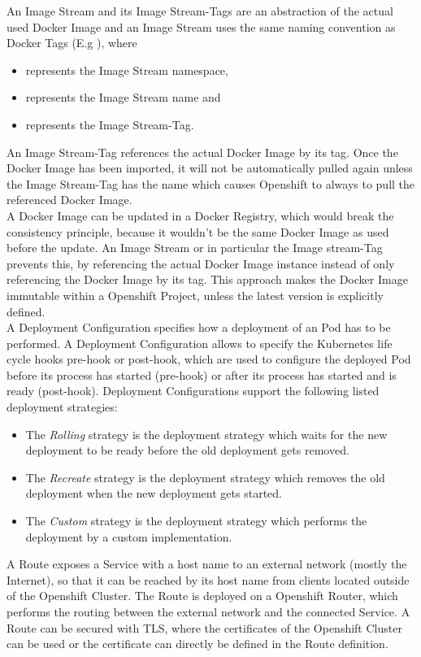 An Image Stream and its Image Stream-Tags are an abstraction of the actual used Docker Image and an Image Stream uses the same naming convention as Docker Tags (E.g ), where
\begin{itemize}
	\item {} represents the Image Stream namespace,
	\item {} represents the Image Stream name and
	\item {} represents the Image Stream-Tag.
\end{itemize}
An Image Stream-Tag references the actual Docker Image by its tag. Once the Docker Image has been imported, it will not be automatically pulled again unless the Image Stream-Tag has the name  which causes Openshift to always to pull the referenced Docker Image. \\

A Docker Image can be updated in a Docker Registry, which would break the consistency principle, because it wouldn't be the same Docker Image as used before the update. An Image Stream or in particular the Image stream-Tag prevents this, by referencing the actual Docker Image instance instead of only referencing the Docker Image by its tag. This approach makes the Docker Image immutable within a Openshift Project, unless the latest version is explicitly defined.  \\

A Deployment Configuration specifies how a deployment of an Pod has to be performed. A Deployment Configuration allows to specify the Kubernetes life cycle hooks pre-hook or post-hook, which are used to configure the deployed Pod before its process has started (pre-hook) or after its process has started and is ready (post-hook). Deployment Configurations support the following listed deployment strategies:
\begin{itemize}
	\item The \emph{Rolling} strategy is the deployment strategy which waits for the new deployment to be ready before the old deployment gets removed.
	\item The \emph{Recreate} strategy is the deployment strategy which removes the old deployment when the new deployment gets started.
	\item The \emph{Custom} strategy is the deployment strategy which performs the deployment by a custom implementation.
\end{itemize}

A Route exposes a Service with a host name to an external network (mostly the Internet), so that it can be reached by its host name from clients located outside of the Openshift Cluster. The Route is deployed on a Openshift Router, which performs the routing between the external network and the connected Service. A Route can be secured with TLS, where the certificates of the Openshift Cluster can be used or the certificate can directly be defined in the Route definition. \\